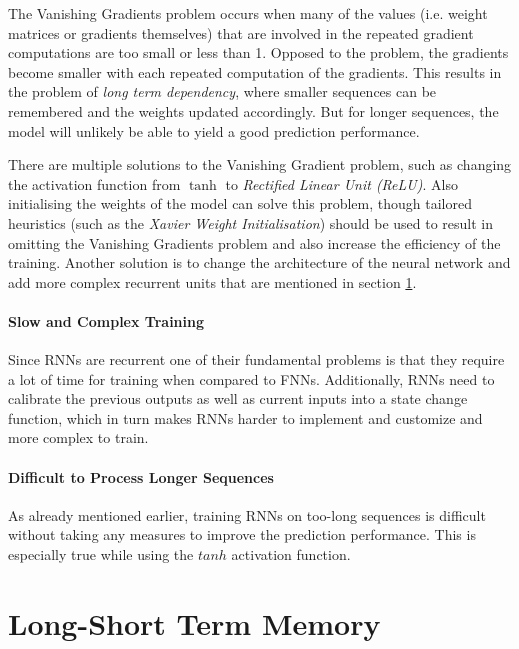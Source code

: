                 The Vanishing Gradients problem occurs when many of the values (i.e. weight matrices or gradients themselves) that are involved in the repeated gradient computations are too small or less than 1. Opposed to the  problem, the gradients become smaller with each repeated computation of the gradients.
                This results in the problem of \emph{long term dependency}, where smaller sequences can be remembered and the weights updated accordingly. But for longer sequences, the model will unlikely be able to yield a good prediction performance.

                There are multiple solutions to the Vanishing Gradient problem, such as changing the activation function from $\tanh$ to \emph{Rectified Linear Unit (ReLU)}. Also initialising the weights of the model can solve this problem, though tailored heuristics (such as the \emph{Xavier Weight Initialisation}) should be used to result in omitting the Vanishing Gradients problem and also increase the efficiency of the training. Another solution is to change the architecture of the neural network and add more complex recurrent units that are mentioned in section \ref{sec:lstm-background}.

            \paragraph{Slow and Complex Training}

                Since RNNs are recurrent one of their fundamental problems is that they require a lot of time for training when compared to FNNs. Additionally, RNNs need to calibrate the previous outputs as well as current inputs into a state change function, which in turn makes RNNs harder to implement and customize and more complex to train.

            \paragraph{Difficult to Process Longer Sequences}

                As already mentioned earlier, training RNNs on too-long sequences is difficult without taking any measures to improve the prediction performance. This is especially true while using the $tanh$ activation function. 
                
    \section{Long-Short Term Memory}
    \label{sec:lstm-background}

